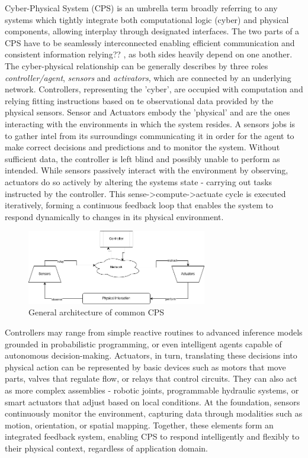 Cyber-Physical System (CPS) is an umbrella term broadly referring to any systems which tightly integrate both computational logic (cyber) and physical components, allowing interplay
through designated interfaces. \cite{cpsModelDesc} The two parts of a CPS have to be seamlessly interconnected enabling efficient communication and consistent information
relying?? \cite{cpsChallengesAndFuture}, as both sides heavily depend on one another.
The cyber-physical relationship can be generally describes by three roles \textit{controller/agent}, \textit{sensors} and \textit{activators},
which are connected by an underlying network.
Controllers, representing the 'cyber', are occupied with computation and relying fitting instructions based on te observational data provided by the physical sensors.
Sensor and Actuators embody the 'physical' and are the ones interacting with the environments in which the system resides. A sensors jobs is to gather intel from its
surroundings communicating it in order for the agent to make correct decisions and predictions and to monitor the system. Without sufficient data, the controller is left
blind and possibly  unable to perform as intended. While sensors passively interact with the environment by observing, actuators do so actively by altering the systems state
- carrying out tasks instructed by the controller. This sense->compute->actuate cycle is executed iteratively, forming a continuous feedback loop that enables the system to
respond dynamically to changes in its physical environment.

\begin{figure}[htbp]
  \centering
  \includegraphics[width=0.7\textwidth]{graphics/cpsGeneralArchitecture.png}
  \caption{General architecture of common CPS}
  \label{fig:cps_architecture}
\end{figure}


Controllers may range from simple reactive routines to advanced inference models grounded in probabilistic programming, or even intelligent agents capable of autonomous
decision-making. Actuators, in turn, translating these decisions into physical action can be represented by basic devices such as motors that move parts,
valves that regulate flow, or relays that control circuits. They can also act as more complex assemblies - robotic joints, programmable hydraulic systems, or smart actuators
that adjust based on local conditions. At the foundation, sensors continuously monitor the environment, capturing data through modalities such as motion,
orientation, or spatial mapping. Together, these elements form  an integrated feedback system, enabling CPS to respond intelligently and flexibly to their physical context,
regardless of application domain.\\


